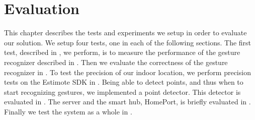 \chapter{Evaluation}\label{chap:evaluation}
This chapter describes the tests and experiments we setup in order to evaluate our solution. 
We setup four tests, one in each of the following sections. 
The first test, described in , we perform, 
is to measure the performance of the gesture recognizer described in . 
Then we evaluate the correctness of the gesture recognizer in .
To test the precision of our indoor location, 
we perform precision tests on the Estimote SDK in .
Being able to detect points, and thus when to start recognizing gestures, we implemented a point detector. This detector is evaluated in .
The server and the smart hub, HomePort, is briefly evaluated in .
Finally we test the system as a whole in .







% 